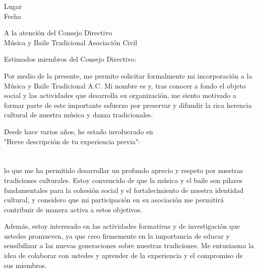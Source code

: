 \documentclass[a4paper,12pt]{letter}
\begin{document}
\begin{flushright}
Lugar
    \underline{\hspace{5cm}} \\ %
Fecha
    \underline{\hspace{5cm}} \\ %
\end{flushright}

\vspace{1cm}



\vspace{1cm}

A la atención del Consejo Directivo \\
Música y Baile Tradicional Asociación Civil  \\


\vspace{1cm}

Estimados miembros del Consejo Directivo:

Por medio de la presente, me permito solicitar formalmente mi incorporación a la Música y Baile Tradicional A.C. Mi nombre es \underline{\hspace{8cm}} %
y, tras conocer a fondo el objeto social y las actividades que desarrolla su organización, me siento motivado a formar parte de este importante esfuerzo por preservar y difundir la rica herencia cultural de nuestra música y danza tradicionales.

Desde hace varios años, he estado involucrado en \\ "Breve descripción de tu experiencia previa": \underline{\hspace{9cm}} \\
 \underline{\hspace{17cm}} \\
 \underline{\hspace{17cm}} \\
lo que me ha permitido desarrollar un profundo aprecio y respeto por nuestras tradiciones culturales. Estoy convencido de que la música y el baile son pilares fundamentales para la cohesión social y el fortalecimiento de nuestra identidad cultural, y considero que mi participación en su asociación me permitirá contribuir de manera activa a estos objetivos.

Además, estoy interesado en las actividades formativas y de investigación que ustedes promueven, ya que creo firmemente en la importancia de educar y sensibilizar a las nuevas generaciones sobre nuestras tradiciones. Me entusiasma la idea de colaborar con ustedes y aprender de la experiencia y el compromiso de sus miembros.
\end{document}

